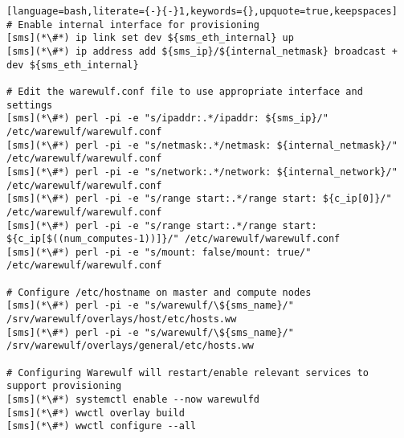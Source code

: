 \begin{lstlisting}[language=bash,literate={-}{-}1,keywords={},upquote=true,keepspaces]
# Enable internal interface for provisioning
[sms](*\#*) ip link set dev ${sms_eth_internal} up
[sms](*\#*) ip address add ${sms_ip}/${internal_netmask} broadcast + dev ${sms_eth_internal}

# Edit the warewulf.conf file to use appropriate interface and settings
[sms](*\#*) perl -pi -e "s/ipaddr:.*/ipaddr: ${sms_ip}/" /etc/warewulf/warewulf.conf
[sms](*\#*) perl -pi -e "s/netmask:.*/netmask: ${internal_netmask}/" /etc/warewulf/warewulf.conf
[sms](*\#*) perl -pi -e "s/network:.*/network: ${internal_network}/" /etc/warewulf/warewulf.conf
[sms](*\#*) perl -pi -e "s/range start:.*/range start: ${c_ip[0]}/" /etc/warewulf/warewulf.conf
[sms](*\#*) perl -pi -e "s/range start:.*/range start: ${c_ip[$((num_computes-1))]}/" /etc/warewulf/warewulf.conf
[sms](*\#*) perl -pi -e "s/mount: false/mount: true/" /etc/warewulf/warewulf.conf

# Configure /etc/hostname on master and compute nodes
[sms](*\#*) perl -pi -e "s/warewulf/\${sms_name}/" /srv/warewulf/overlays/host/etc/hosts.ww
[sms](*\#*) perl -pi -e "s/warewulf/\${sms_name}/" /srv/warewulf/overlays/general/etc/hosts.ww

# Configuring Warewulf will restart/enable relevant services to support provisioning
[sms](*\#*) systemctl enable --now warewulfd
[sms](*\#*) wwctl overlay build
[sms](*\#*) wwctl configure --all
\end{lstlisting}
